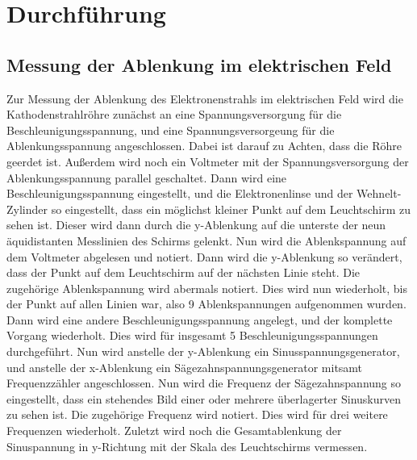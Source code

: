 \section{Durchführung}
\label{sec:Durchführung}
\subsection{Messung der Ablenkung im elektrischen Feld}
Zur Messung der Ablenkung des Elektronenstrahls im elektrischen Feld wird die Kathodenstrahlröhre zunächst an eine Spannungsversorgung für die Beschleunigungsspannung,
und eine Spannungsversorgeung für die Ablenkungsspannung angeschlossen. Dabei ist darauf zu Achten, dass die Röhre geerdet ist.
Außerdem wird noch ein Voltmeter mit der Spannungsversorgung der Ablenkungsspannung parallel
geschaltet. Dann wird eine Beschleunigungsspannung eingestellt, und die Elektronenlinse und der Wehnelt-Zylinder so eingestellt, dass ein möglichst kleiner
Punkt auf dem Leuchtschirm zu sehen ist. Dieser wird dann durch die y-Ablenkung auf die unterste der neun äquidistanten Messlinien des Schirms gelenkt.
Nun wird die Ablenkspannung auf dem Voltmeter abgelesen und notiert.
Dann wird die y-Ablenkung so verändert, dass der Punkt auf dem Leuchtschirm auf der nächsten Linie steht. Die
zugehörige Ablenkspannung wird abermals notiert. Dies wird nun wiederholt, bis der Punkt auf allen Linien war, also 9 Ablenkspannungen aufgenommen wurden.
Dann wird eine andere Beschleunigungsspannung angelegt, und der komplette Vorgang wiederholt. Dies wird für insgesamt 5 Beschleunigungsspannungen durchgeführt.
Nun wird anstelle der y-Ablenkung ein Sinusspannungsgenerator, und anstelle der x-Ablenkung ein Sägezahnspannungsgenerator mitsamt Frequenzzähler angeschlossen.
Nun wird die Frequenz der Sägezahnspannung so eingestellt, dass ein stehendes Bild einer oder mehrere überlagerter Sinuskurven zu sehen ist.
Die zugehörige Frequenz wird notiert. Dies wird für drei weitere Frequenzen wiederholt. Zuletzt wird noch die Gesamtablenkung der Sinuspannung in y-Richtung mit
der Skala des Leuchtschirms vermessen.

